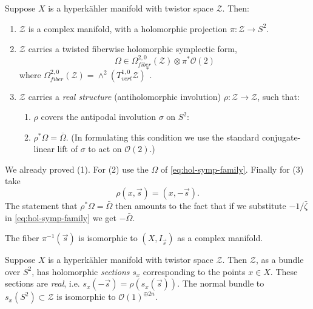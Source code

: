 \documentclass[12pt,letterpaper,reqno]{article}
\numberwithin{equation}{section}
\newcommand{\cZ}{\ensuremath{\mathcal Z}}
\newcommand{\cO}{\ensuremath{\mathcal O}}
\newcommand{\hk}{hyperk\"ahler\xspace}
\newcommand{\ti}[1]{\textit{#1}}
\begin{document}
\begin{prop} \label{prop:twistor-space-properties}
Suppose $X$ is a \hk manifold with twistor space $\cZ$. Then:
\begin{enumerate}
\item $\cZ$ is a complex manifold, with a 
  holomorphic projection $\pi: \cZ \to S^2$.
\item $\cZ$ carries a twisted fiberwise holomorphic symplectic form,
\begin{equation}
  \Omega \in \Omega^{2,0}_{fiber}(\cZ) \otimes \pi^* \cO(2)
\end{equation}
where $\Omega^{2,0}_{fiber}(\cZ) = \wedge^2 (T^{1,0}_{vert} \cZ)^*$.
\item $\cZ$ carries a \ti{real structure} (antiholomorphic involution)
$\rho: \cZ \to \cZ$, such that:
\begin{enumerate}
\item $\rho$ covers the antipodal involution $\sigma$ on $S^2$:
\begin{center}
\end{center}
\item $\rho^* \Omega = \overline\Omega$.
(In formulating this condition we use the standard
conjugate-linear lift of $\sigma$ to act on $\cO(2)$.)
\end{enumerate}
\end{enumerate}
\end{prop}

\begin{pf}
We already proved (1). 
For (2) use the $\Omega$ of \eqref{eq:hol-symp-family}.
Finally for (3) take
\begin{equation}
  \rho(x, \vec s) = (x, - \vec s).
\end{equation}
The statement that $\rho^* \Omega = \bar\Omega$ then 
amounts to the fact that if we substitute $- 1 / \bar\zeta$
in \eqref{eq:hol-symp-family} we get $-\bar\Omega$.
\end{pf}

The fiber $\pi^{-1}(\vec s)$ is isomorphic to
$(X,I_{\vec s})$ as a complex manifold.

\begin{prop}
Suppose $X$ is a \hk manifold with twistor space $\cZ$.
Then
$\cZ$, as a bundle over $S^2$, 
has holomorphic \ti{sections} $s_x$ corresponding
to the points $x \in X$.
These sections are \ti{real}, i.e. $s_x(-\vec s) = \rho(s_x(\vec s))$.
The normal bundle to $s_x(S^2) \subset \cZ$ is isomorphic
to $\cO(1)^{\oplus 2n}$.
\end{prop}
\end{document}
